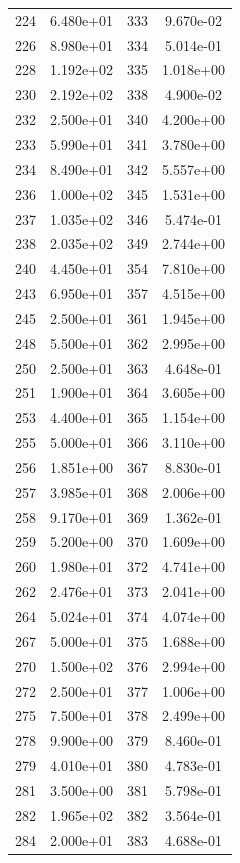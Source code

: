 \documentclass[12pt]{article}
\begin{document}
\begin{longtable}{@{}cccc@{}}
224 & 6.480e+01 & 333 & 9.670e-02 \\
226 & 8.980e+01 & 334 & 5.014e-01 \\
228 & 1.192e+02 & 335 & 1.018e+00 \\
230 & 2.192e+02 & 338 & 4.900e-02 \\
232 & 2.500e+01 & 340 & 4.200e+00 \\
233 & 5.990e+01 & 341 & 3.780e+00 \\
234 & 8.490e+01 & 342 & 5.557e+00 \\
236 & 1.000e+02 & 345 & 1.531e+00 \\
237 & 1.035e+02 & 346 & 5.474e-01 \\
238 & 2.035e+02 & 349 & 2.744e+00 \\
240 & 4.450e+01 & 354 & 7.810e+00 \\
243 & 6.950e+01 & 357 & 4.515e+00 \\
245 & 2.500e+01 & 361 & 1.945e+00 \\
248 & 5.500e+01 & 362 & 2.995e+00 \\
250 & 2.500e+01 & 363 & 4.648e-01 \\
251 & 1.900e+01 & 364 & 3.605e+00 \\
253 & 4.400e+01 & 365 & 1.154e+00 \\
255 & 5.000e+01 & 366 & 3.110e+00 \\
256 & 1.851e+00 & 367 & 8.830e-01 \\
257 & 3.985e+01 & 368 & 2.006e+00 \\
258 & 9.170e+01 & 369 & 1.362e-01 \\
259 & 5.200e+00 & 370 & 1.609e+00 \\
260 & 1.980e+01 & 372 & 4.741e+00 \\
262 & 2.476e+01 & 373 & 2.041e+00 \\
264 & 5.024e+01 & 374 & 4.074e+00 \\
267 & 5.000e+01 & 375 & 1.688e+00 \\
270 & 1.500e+02 & 376 & 2.994e+00 \\
272 & 2.500e+01 & 377 & 1.006e+00 \\
275 & 7.500e+01 & 378 & 2.499e+00 \\
278 & 9.900e+00 & 379 & 8.460e-01 \\
279 & 4.010e+01 & 380 & 4.783e-01 \\
281 & 3.500e+00 & 381 & 5.798e-01 \\
282 & 1.965e+02 & 382 & 3.564e-01 \\
284 & 2.000e+01 & 383 & 4.688e-01 \\

\end{longtable}
\end{document}
